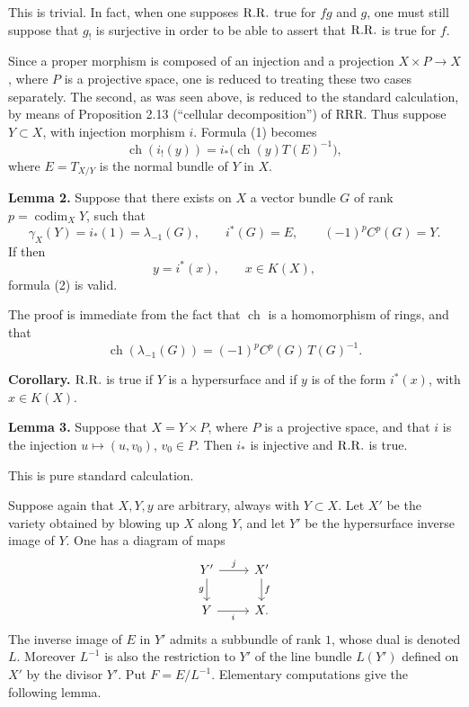\documentclass[11pt]{article}
\newcommand{\ch}{\operatorname{ch}}
\newcommand{\RRR}{\mathrm{RRR}}
\providecommand{\codim}{\operatorname{codim}}
\providecommand{\ch}{\operatorname{ch}}
\providecommand{\codim}{\operatorname{codim}}
\begin{document}
This is trivial. In fact, when one supposes \(\mathrm{R.R.}\) true for \(fg\) and \(g\), one must still suppose that \(g_!\) is surjective in order to be able to assert that \(\mathrm{R.R.}\) is true for \(f\).

Since a proper morphism is composed of an injection and a projection \(X\times P\to X\), where \(P\) is a projective space, one is reduced to treating these two cases separately. The second, as was seen above, is reduced to the standard calculation, by means of Proposition 2.13 (``cellular decomposition'') of \(\RRR\). Thus suppose \(Y\subset X\), with injection morphism \(i\). Formula (1) becomes
\begin{equation}\tag{2}
  \ch(i_!(y))=i_*\bigl(\ch(y)T(E)^{-1}\bigr),
\end{equation}
where \(E=T_{X/Y}\) is the normal bundle of \(Y\) in \(X\).

\textbf{Lemma 2.} Suppose that there exists on \(X\) a vector bundle \(G\) of rank \(p=\codim_XY\), such that
\begin{equation}\tag{3}
  \gamma_X(Y)=i_*(1)=\lambda_{-1}(G),\qquad
  i^*(G)=E,\qquad
  (-1)^pC^p(G)=Y.
\end{equation}
If then
\begin{equation}\tag{4}
  y=i^*(x),\qquad x\in K(X),
\end{equation}
formula (2) is valid.

The proof is immediate from the fact that \(\ch\) is a homomorphism of rings, and that
\begin{equation}\tag{5}
  \ch(\lambda_{-1}(G))=(-1)^pC^p(G)\,T(G)^{-1}.
\end{equation}

\textbf{Corollary.} \(\mathrm{R.R.}\) is true if \(Y\) is a hypersurface and if \(y\) is of the form \(i^*(x)\), with \(x\in K(X)\).

\textbf{Lemma 3.} Suppose that \(X=Y\times P\), where \(P\) is a projective space, and that \(i\) is the injection \(u\mapsto (u,v_0)\), \(v_0\in P\). Then \(i_*\) is injective and \(\mathrm{R.R.}\) is true.

This is pure standard calculation.

Suppose again that \(X,Y,y\) are arbitrary, always with \(Y\subset X\). Let \(X'\) be the variety obtained by blowing up \(X\) along \(Y\), and let \(Y'\) be the hypersurface inverse image of \(Y\). One has a diagram of maps
\[
\begin{tikzcd}
Y' \arrow[r,"j"] \arrow[d,"g"'] & X' \arrow[d,"f"]\\
Y \arrow[r,"i"'] & X .
\end{tikzcd}
\]
The inverse image of \(E\) in \(Y'\) admits a subbundle of rank \(1\), whose dual is denoted \(L\). Moreover \(L^{-1}\) is also the restriction to \(Y'\) of the line bundle \(L(Y')\) defined on \(X'\) by the divisor \(Y'\). Put \(F=E/L^{-1}\). Elementary computations give the following lemma.
\end{document}
